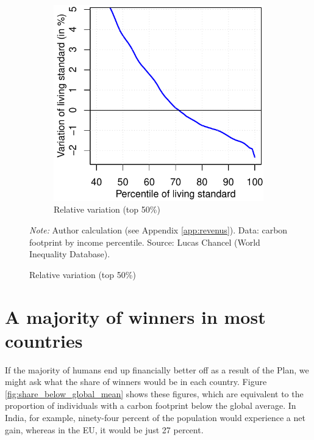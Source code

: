 \documentclass[a5paper,english,openany]{memoir}
\begin{document}
\begin{figure}[h!]
\begin{subfigure}{.5\textwidth}
\end{subfigure} \quad
\begin{subfigure}{.5\textwidth}
  \caption[]{Relative variation (top 50\%)}\label{fig:evol_distr_d}
  \includegraphics[width=\textwidth]{../figures/policies/gcp_var_rev_rich_only_en.pdf}
\end{subfigure}
{\footnotesize \textit{Note:} Author calculation
(see %
Appendix \ref{app:revenus}). Data: carbon footprint by income percentile. Source: Lucas Chancel (World Inequality Database).}
\end{figure}

\section{A majority of winners in most countries}

If the majority of humans end up %
financially better off as a result of the Plan, we might ask what the share of winners would be in each country. Figure \ref{fig:share_below_global_mean} shows these figures, which are equivalent to the proportion of individuals with a carbon footprint below the global average. In India, for example, ninety-four percent of the population would experience a net gain, %
whereas %
in the EU, %
it %
would be just 27 percent. %
\end{document}
